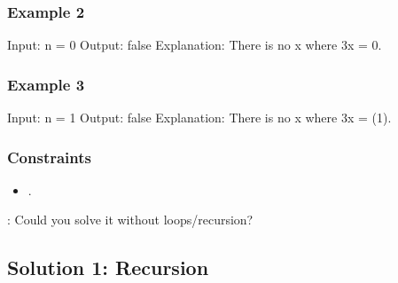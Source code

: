 \documentclass[letterpaper,12pt,english]{book}
\begin{document}
\subsubsection{Example 2}
\label{\detokenize{Mathematics/09_MTH_326_Power_of_Three:example-2}}
\begin{sphinxVerbatim}[commandchars=\\\{\}]
Input: n = 0
Output: false
Explanation: There is no x where 3\PYGZca{}x = 0.
\end{sphinxVerbatim}


\subsubsection{Example 3}
\label{\detokenize{Mathematics/09_MTH_326_Power_of_Three:example-3}}
\begin{sphinxVerbatim}[commandchars=\\\{\}]
Input: n = \PYGZhy{}1
Output: false
Explanation: There is no x where 3\PYGZca{}x = (\PYGZhy{}1).
\end{sphinxVerbatim}


\subsubsection{Constraints}
\label{\detokenize{Mathematics/09_MTH_326_Power_of_Three:constraints}}\begin{itemize}
\item {} 
\sphinxAtStartPar
{}.

\end{itemize}

\sphinxAtStartPar
{}: Could you solve it without loops/recursion?


\subsection{Solution 1: Recursion}
\label{\detokenize{Mathematics/09_MTH_326_Power_of_Three:solution-1-recursion}}
\end{document}
